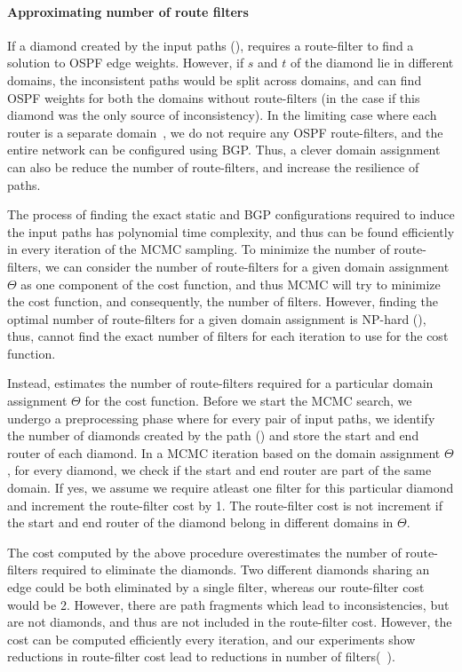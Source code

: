 \paragraph{Approximating number of route filters}
If a diamond created by the input paths (),
\name requires a route-filter to find a solution to OSPF
edge weights. However, if $s$ and $t$ of the diamond lie in
different domains, the inconsistent paths would be split 
across domains, and \name can find OSPF weights for
both the domains without route-filters (in the case if this
diamond was the only source of inconsistency). In the limiting
case where each router is a separate domain~\cite{bgpdatacenter}, 
we do not require any OSPF route-filters, and the entire 
network can be configured using BGP. Thus, a clever domain
assignment can also be reduce the number of route-filters, and
increase the resilience of paths. 


The process of finding the exact static and BGP configurations
required to induce the input paths has polynomial time complexity,
and thus can be found efficiently in every iteration of the MCMC
sampling. To minimize the number of route-filters, we can consider 
the number of route-filters for a given domain assignment $\Theta$ 
as one component of the cost function, and thus MCMC will try
to minimize the cost function, and consequently, the number of
filters. However, finding the optimal number of route-filters for a given domain assignment is NP-hard (), thus, \name
cannot find the exact number of filters for each iteration to use for
the cost function. 

Instead, \name estimates the number of route-filters required for a 
particular domain assignment $\Theta$ for the cost function. Before 
we start the MCMC search, we undergo a preprocessing phase 
where for every pair of input paths, we identify the
number of diamonds created by the path () and store the start and end router of 
each diamond. In a MCMC iteration based on the domain
assignment $\Theta$, for every diamond, we check if the
start and end router are part of the same domain. If yes, 
we assume we require atleast one filter for this particular
diamond and increment the route-filter cost by 1. The 
route-filter cost is not increment if the start and end 
router of the diamond belong in different domains in $\Theta$.

The cost computed by the above procedure overestimates the
number of route-filters required to eliminate the diamonds.  
Two different diamonds sharing an edge could be both 
eliminated by a single filter, whereas our route-filter cost 
would be 2. However, there are path fragments which 
lead to inconsistencies, but are not diamonds, and thus
are not included in the route-filter cost. However, the 
cost can be computed efficiently every iteration, and 
our experiments show reductions in route-filter cost 
lead to reductions in number of filters(~). 







